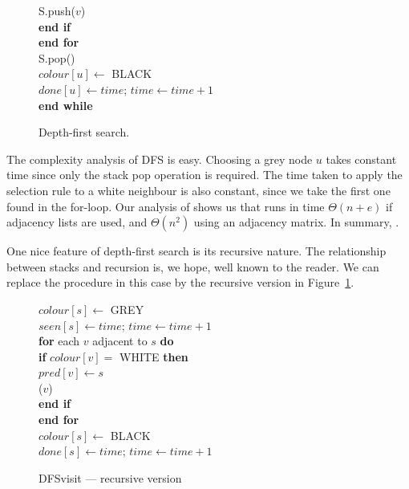 \begin{figure}[htbp]
{\> \> \> S.push($v$) \\

\> \> \textbf{end if} \\

\> \textbf{end for} \\

\> S.pop() \\

\> $colour[u] \gets $ BLACK \\

\> $done[u] \gets time$; $time \gets time + 1$ \\

\textbf{end while} \\
}

\caption{Depth-first search.}

\end{figure}

The complexity analysis of DFS is easy. Choosing a grey node $u$ takes
constant time since only the stack pop operation is required. The time
taken to apply the selection rule to a white neighbour is also constant,
since we take the first one found in the for-loop. Our analysis of
 shows us that  runs in time $\Theta(n + e)$
if adjacency lists are used, and $\Theta(n^2)$ using an adjacency matrix.
In summary, .

One nice feature of depth-first search is its recursive nature.  The
relationship between stacks and recursion is, we hope, well known to the
reader. We can replace the  procedure in this case by
the recursive version in Figure~\ref{fig:DFSreccode}.

\begin{figure}[htbp]
\label{fig:DFSreccode}

{

$colour[s] \gets $ GREY \\

$seen[s] \gets time$; $time \gets time + 1$ \\

\textbf{for} each $v$ adjacent to $s$ \textbf{do} \\

\> \textbf{if} $colour[v] = $ WHITE \textbf{then} \\

\> \> $pred[v] \gets s$ \\

\> \> ($v$) \\

\> \textbf{end if} \\

\textbf{end for} \\

$colour[s] \gets $ BLACK \\

$done[s] \gets time $; $time \gets time + 1$ \\
}

\caption{DFSvisit --- recursive version}

\end{figure}

